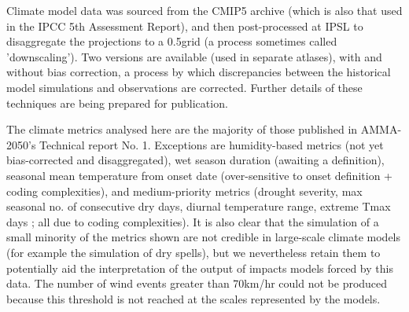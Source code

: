 Climate model data was sourced from the CMIP5 archive (which is also that used in the IPCC 5th Assessment Report), and then post-processed at IPSL to disaggregate the projections to a 0.5\textdegree grid (a process sometimes called 'downscaling'). Two versions are available (used in separate atlases), with and without bias correction, a process by which discrepancies between the historical model simulations and observations are corrected. Further details of these techniques are being prepared for publication.

The climate metrics analysed here are the majority of those published in AMMA-2050's Technical report No. 1. Exceptions are humidity-based metrics (not yet bias-corrected and disaggregated), wet season duration (awaiting a definition), seasonal mean temperature from onset date (over-sensitive to onset definition + coding complexities), and medium-priority metrics (drought severity, max seasonal no. of consecutive dry days, diurnal temperature range, extreme Tmax days ; all due to coding complexities). It is also clear that the simulation of a small minority of the metrics shown are not credible in large-scale climate models (for example the simulation of dry spells), but we nevertheless retain them to potentially aid the interpretation of the output of impacts models forced by this data. The number of wind events greater than 70km/hr could not be produced because this threshold is not reached at the scales represented by the models.
